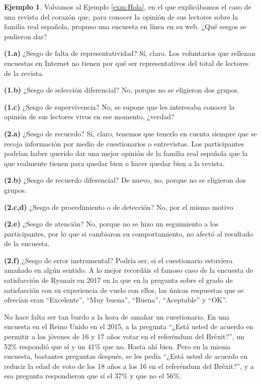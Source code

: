 \documentclass[
]{book}
\theoremstyle{definition}
\theoremstyle{definition}
\newtheorem{example}{Ejemplo}[chapter]
\theoremstyle{definition}
\theoremstyle{definition}
\theoremstyle{remark}
\begin{document}
\begin{example}
\protect\hypertarget{exm:Hola2}{}\label{exm:Hola2}Volvamos al Ejemplo \ref{exm:Hola}, en el que explicábamos el caso de una revista del corazón que, para conocer la opinión de sus lectores sobre la familia real española, propuso una encuesta en línea en su web. ¿Qué sesgos se pudieron dar?
\end{example}

\textbf{(1.a)} ¿Sesgo de falta de representatividad? Sí, claro. Los voluntarios que rellenan encuestas en Internet no tienen por qué ser representativos del total de lectores de la revista.

\textbf{(1.b)} ¿Sesgo de selección diferencial? No, porque no se eligieron dos grupos.

\textbf{(1.c)} ¿Sesgo de supervivencia? No, se supone que les interesaba conocer la opinión de sus lectores vivos en ese momento, ¿verdad?

\textbf{(2.a)} ¿Sesgo de recuerdo? Sí, claro, tenemos que tenerlo en cuenta siempre que se recoja información por medio de cuestionarios o entrevistas. Los participantes podrían haber querido dar una mejor opinión de la familia real española que la que realmente tienen para quedar bien o hacer quedar bien a la revista.

\textbf{(2.b)} ¿Sesgo de recuerdo diferencial? De nuevo, no, porque no se eligieron dos grupos.

\textbf{(2.c,d)} ¿Sesgo de procedimiento o de detección? No, por el mismo motivo

\textbf{(2.e)} ¿Sesgo de atención? No, porque no se hizo un seguimiento a los participantes, por lo que si cambiaron su comportamiento, no afectó al resultado de la encuesta.

\textbf{(2.f)} ¿Sesgo de error instrumental? Podría ser, si el cuestionario estuviera amañado en algún sentido. A lo mejor recordáis el famoso caso de la encuesta de satisfacción de Ryanair en 2017 en la que en la pregunta sobre el grado de satisfacción con su experiencia de vuelo con ellos, las únicas respuestas que se ofrecían eran ``Excelente'', ``Muy buena'', ``Buena'', ``Aceptable'' y ``OK''.

\begin{rmdromans}
No hace falta ser tan burdo a la hora de amañar un cuestionario. En una encuesta en el Reino Unido en el 2015, a la pregunta ``¿Está usted de acuerdo en permitir a los jóvenes de 16 y 17 años votar en el referéndum del Bréxit?'', un 52\% respondió que sí y un 41\% que no. Hasta ahí bien. Pero en la misma encuesta, bastantes preguntas después, se les pedía ``¿Está usted de acuerdo en reducir la edad de voto de los 18 años a los 16 en el referéndum del Bréxit?'', y a esa pregunta respondieron que sí el 37\% y que no el 56\%.
\end{rmdromans}
\end{document}
